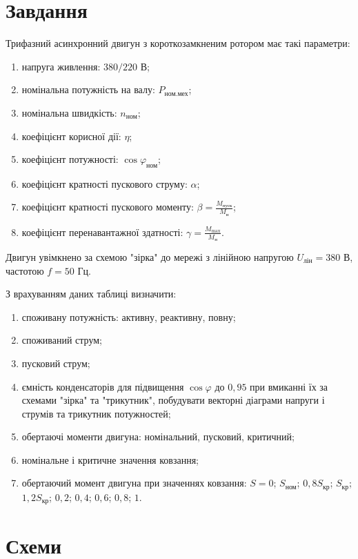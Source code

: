 \documentclass[a4paper]{article}
\begin{document}
    \section*{Завдання}
Трифазний асинхронний двигун з короткозамкненим ротором має такі параметри:
\begin{enumerate}
    \item напруга живлення: $380/220$ В;
    \item номінальна потужність на валу: $P_{\text{ном.мех}}$;
    \item номінальна швидкість: $n_{\text{ном}}$;
    \item коефіцієнт корисної дії: $\eta$;
    \item коефіцієнт потужності: $\cos \varphi_{\text{ном}}$;
    \item коефіцієнт кратності пускового струму: $\alpha$;
    \item коефіцієнт кратності пускового моменту: $\beta = \frac{M_{\text{пуск}}}{M_{\text{н}}}$;
    \item коефіцієнт перенавантажної здатності: $\gamma = \frac{M_{\text{max}}}{M_{\text{н}}}$.
\end{enumerate}

Двигун увімкнено за схемою "зірка" до мережі з лінійною напругою $U_{\text{лін}} = 380$ В, частотою $f = 50$ Гц.

З врахуванням даних таблиці визначити:
\begin{enumerate}
    \item споживану потужність: активну, реактивну, повну;
    \item споживаний струм;
    \item пусковий струм;
    \item ємність конденсаторів для підвищення $\cos\varphi$ до $0,95$ при вмиканні їх за схемами "зірка" та "трикутник", побудувати векторні діаграми напруги і струмів та трикутник потужностей;
    \item обертаючі моменти двигуна: номінальний, пусковий, критичний;
    \item номінальне і критичне значення ковзання;
    \item обертаючий момент двигуна при значеннях ковзання: $S = 0$; $S_{\text{ном}}$; $0,8S_{\text{кр}}$; $S_{\text{кр}}$; $1,2S_{\text{кр}}$; $0,2$; $0,4$; $0,6$; $0,8$; $1$.
\end{enumerate}
    
    \newpage 
    \section*{Схеми}
\end{document}
